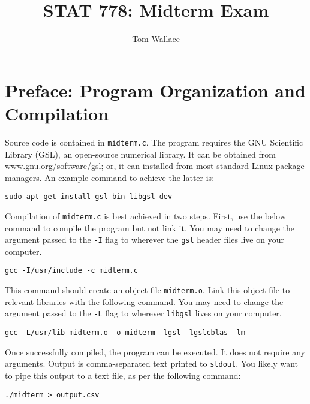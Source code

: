 \documentclass{report}
\title{STAT 778: Midterm Exam}
\author{Tom Wallace}
\begin{document}
\maketitle

\section*{Preface: Program Organization and Compilation}

Source code is contained in \texttt{midterm.c}. 
The program requires the GNU Scientific Library (GSL), an
open-source numerical library. It can be obtained from
\url{www.gnu.org/software/gsl}; or, it can installed from most standard Linux
package managers. An example command to achieve the latter is:

\begin{center}
	\texttt{sudo apt-get install gsl-bin libgsl-dev}
\end{center}

Compilation of \texttt{midterm.c} is best achieved in two steps. First, use the below
command to compile the program but not link it. You may need to change the
argument passed to the \texttt{-I} flag to wherever the \texttt{gsl} header
files live on your computer. 

\begin{center}
	\texttt{gcc -I/usr/include -c midterm.c}
\end{center}

This command should create an object file \texttt{midterm.o}. Link this 
object file to relevant libraries with the following command.
You may need to change the argument passed to the \texttt{-L} flag to
wherever \texttt{libgsl} lives on your computer.

\begin{center}
	\texttt{gcc -L/usr/lib midterm.o -o midterm -lgsl -lgslcblas -lm}
\end{center}

Once successfully compiled, the program can be executed. It does not require any
arguments. Output is comma-separated text printed to \texttt{stdout}. You likely want to pipe this
output to a text file, as per the following command:

\begin{center}
	\texttt{./midterm > output.csv}
\end{center}
\end{document}
